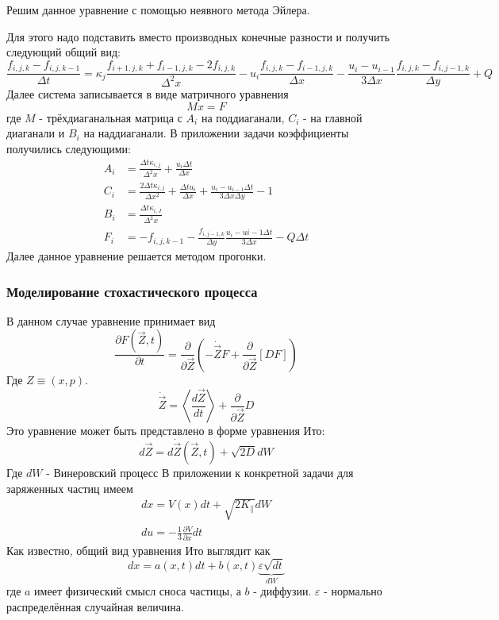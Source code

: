 \documentclass[a4paper,11pt]{article} %
\begin{document}
Решим данное уравнение с помощью неявного метода Эйлера.

Для этого надо подставить вместо производных конечные разности и получить следующий общий вид:
\begin{equation}
\frac{f_{i,j,k} - f_{i,j,k-1}}{\Delta t} = \kappa_{j} \frac{f_{i+1,j,k}+f_{i-1,j,k}-2f_{i,j,k}}{\Delta^2 x} - u_i\frac{f_{i,j,k}-f_{i-1,j,k}}{\Delta x}-\frac{u_i-u_{i-1}}{3\Delta x}\frac{f_{i,j,k}-f_{i,j-1,k}}{\Delta y} + Q
\end{equation}
Далее система записывается в виде матричного уравнения
\begin{equation}
Mx=F
\end{equation}
где $M$ - трёхдиаганальная матрица с $A_i$ на поддиаганали, $C_i$ - на главной диаганали и $B_i$ на наддиаганали. В приложении задачи коэффициенты получились следующими:
\begin{eqnarray}
A_i&=\frac{\Delta t \kappa_{i,j}}{\Delta^2 x} + \frac{u_i\Delta t}{\Delta x}\\
C_i&=\frac{2\Delta t \kappa_{i,j}}{\Delta x^2} + \frac{\Delta t u_i}{\Delta x} + \frac{u_i-u_{i-1}\Delta t}{3\Delta x \Delta y} - 1\\
B_i&=\frac{\Delta t \kappa_{i,J}}{\Delta^2 x}\\
F_i&=-f_{i,j,k-1}-\frac{f_{i,j-1,k}}{\Delta y} \frac{u_i-u{i-1}\Delta t}{3\Delta x} - Q\Delta t
\end{eqnarray} 
Далее данное уравнение решается методом прогонки.
\subsubsection{Моделирование стохастического процесса}
В данном случае уравнение принимает вид
\begin{equation}
\frac{\partial F(\vec{Z}, t)}{\partial t} = \frac{\partial}{\partial \vec{Z}}\left( -\dot{\vec{Z}}F+\frac{\partial}{\partial\vec{Z}}[DF]  \right)
\end{equation}
Где $Z\equiv (x, p)$.
\begin{equation}
\dot{\vec{Z}} = \left< \frac{d\vec{Z}}{dt} \right> + \frac{\partial}{\partial\vec{Z}} D
\end{equation}
Это уравнение может быть представлено в форме уравнения Ито:
\begin{equation}
d\vec{Z} = d\dot{\vec{Z}}(\vec{Z}, t)+\sqrt{2D}dW
\end{equation}
Где $dW$ - Винеровский процесс
В приложении к конкретной задачи для заряженных частиц имеем
\begin{eqnarray}
dx = V(x)dt+\sqrt{2K_{\parallel}}dW\\
du = - \frac{1}{3} \frac{\partial V}{\partial x} dt
\end{eqnarray}
Как известно, общий вид уравнения Ито выглядит как
\begin{equation}
dx = a(x, t)dt + b(x,t) \underbrace{\varepsilon \sqrt{dt}}_{dW}
\end{equation}
где $a$ имеет физический смысл сноса частицы, а $b$ - диффузии. $\varepsilon$ - нормально распределённая случайная величина.
\end{document}
